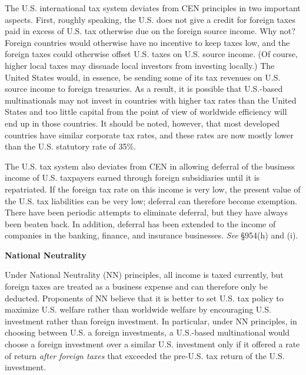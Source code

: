 The U.S. international tax system deviates from CEN principles in two important aspects.  First, roughly speaking, the U.S. does not give a credit for foreign taxes paid in excess of U.S. tax otherwise due on the foreign source income.  Why not?  Foreign countries would otherwise have no incentive to keep taxes low, and the foreign taxes could otherwise offset U.S. taxes on U.S. source income.  (Of course, higher local taxes may dissuade local investors from investing locally.)  The United States would, in essence, be sending some of its tax revenues on U.S. source income to foreign treasuries.  As a result, it is possible that U.S.-based multinationals may not invest in countries with higher tax rates than the United States and too little capital from the point of view of worldwide efficiency will end up in those countries.  It should be noted, however, that most developed countries have similar corporate tax rates, and these rates are now mostly lower than the U.S. statutory rate of 35\%. 

The U.S. tax system also deviates from CEN in allowing deferral of the business income of U.S. taxpayers earned through foreign subsidiaries until it is repatriated.  If the foreign tax rate on this income is very low, the present value of the U.S. tax liabilities can be very low; deferral can therefore become exemption.  There have been periodic attempts to eliminate deferral, but they have always been beaten back.  In addition, deferral has been extended to the income of companies in the banking, finance, and insurance businesses.  \emph{See} \S954(h) and (i).



\begin{center}
				\textbf{National Neutrality}
\end{center}

Under National Neutrality (NN) principles, all income is taxed currently, but foreign taxes are treated as a business expense and can therefore only be deducted.  Proponents of NN believe that it is better to set U.S. tax policy to maximize U.S. welfare rather than worldwide welfare by encouraging U.S. investment rather than foreign investment.  In particular, under NN principles, in choosing between U.S. a foreign investments, a U.S.-based multinational would choose a foreign investment over a similar U.S. investment only if it offered a rate of return \emph{after foreign taxes} that exceeded the pre-U.S. tax return of the U.S. investment.  

